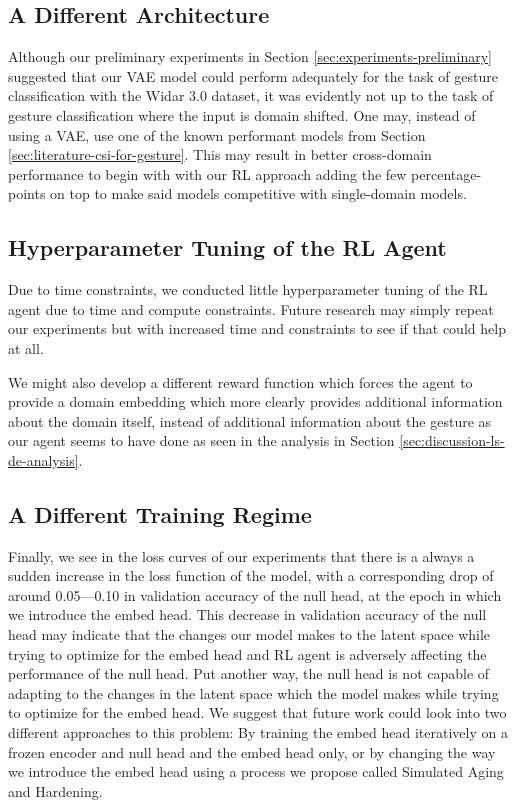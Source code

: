 \subsection{A Different Architecture}

Although our preliminary experiments in Section \ref{sec:experiments-preliminary} suggested that our VAE model could perform adequately for the task of gesture classification with the Widar 3.0 dataset, it was evidently not up to the task of gesture classification where the input is domain shifted.
One may, instead of using a VAE, use one of the known performant models from Section \ref{sec:literature-csi-for-gesture}.
This may result in better cross-domain performance to begin with with our RL approach adding the few percentage-points on top to make said models competitive with single-domain models.

\subsection{Hyperparameter Tuning of the RL Agent}

Due to time constraints, we conducted little hyperparameter tuning of the RL agent due to time and compute constraints. 
Future research may simply repeat our experiments but with increased time and  constraints to see if that could help at all.

We might also develop a different reward function which forces the agent to provide a domain embedding which more clearly provides additional information about the domain itself, instead of additional information about the gesture as our agent seems to have done as seen in the analysis in Section \ref{sec:discussion-ls-de-analysis}.

\subsection{A Different Training Regime}

Finally, we see in the loss curves of our experiments that there is a always a sudden increase in the loss function of the model, with a corresponding drop of around 0.05—0.10 in validation accuracy of the null head, at the epoch in which we introduce the embed head.
This decrease in validation accuracy of the null head may indicate that the changes our model makes to the latent space while trying to optimize for the embed head and RL agent is adversely affecting the performance of the null head.
Put another way, the null head is not capable of adapting to the changes in the latent space which the model makes while trying to optimize for the embed head.
We suggest that future work could look into two different approaches to this problem: By training the embed head iteratively on a frozen encoder and null head and the embed head only, or by changing the way we introduce the embed head using a process we propose called Simulated Aging and Hardening.


